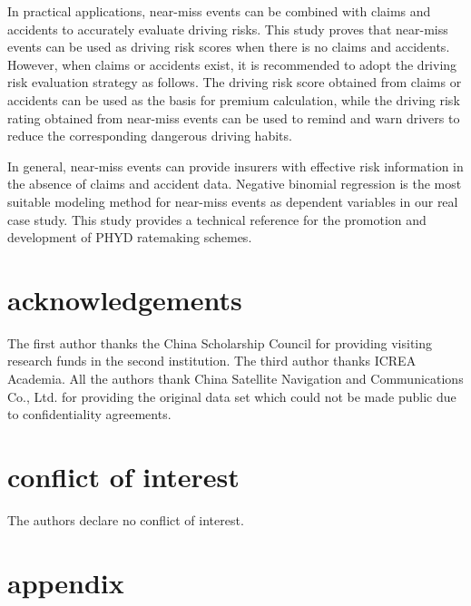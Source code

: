 \documentclass[num-refs]{wiley-article}
\begin{document}
In practical applications, near-miss events can be combined with claims and accidents to accurately evaluate driving risks. This study proves that near-miss events can be used as driving risk scores when there is no claims and accidents. However, when claims or accidents exist, it is recommended to adopt the driving risk evaluation strategy as follows. The driving risk score obtained from claims or accidents can be used as the basis for premium calculation, while the driving risk rating obtained from near-miss events can be used to remind and warn drivers to reduce the corresponding dangerous driving habits.

In general, near-miss events can provide insurers with effective risk information in the absence of claims and accident data. Negative binomial regression is the most suitable modeling method for near-miss events as dependent variables in our real case study. This study provides a technical reference for the promotion and development of PHYD ratemaking schemes.

\section*{acknowledgements}
The first author thanks the China Scholarship Council for providing visiting research funds in the second institution. The third author thanks ICREA Academia. All the authors thank China Satellite Navigation and Communications Co., Ltd. for providing the original data set which could not be made public due to confidentiality agreements.

\section*{conflict of interest}

The authors declare no conflict of interest.



\appendix
\section{appendix}
\end{document}
